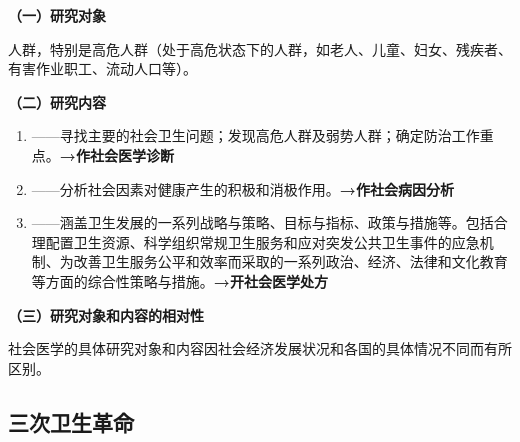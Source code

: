 \begin{keybox}
\textbf{（一）研究对象}

人群，特别是高危人群（处于高危状态下的人群，如老人、儿童、妇女、残疾者、有害作业职工、流动人口等）。

\textbf{（二）研究内容}

\begin{enumerate}[leftmargin=*]
    \item {}——寻找主要的社会卫生问题；发现高危人群及弱势人群；确定防治工作重点。\textbf{→作社会医学诊断}
    \item {}——分析社会因素对健康产生的积极和消极作用。\textbf{→作社会病因分析}
    \item {}——涵盖卫生发展的一系列战略与策略、目标与指标、政策与措施等。包括合理配置卫生资源、科学组织常规卫生服务和应对突发公共卫生事件的应急机制、为改善卫生服务公平和效率而采取的一系列政治、经济、法律和文化教育等方面的综合性策略与措施。\textbf{→开社会医学处方}
\end{enumerate}

\textbf{（三）研究对象和内容的相对性}

社会医学的具体研究对象和内容因社会经济发展状况和各国的具体情况不同而有所区别。
\end{keybox}

\subsection{三次卫生革命}

